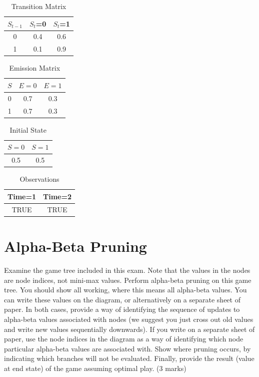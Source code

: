 \documentclass{article}
\begin{document}
\begin{table}[h!]
\caption{Transition Matrix}
\label{hmmvit1}
\begin{center}
\begin{tabular}{ |c||c|c| } 
\hline
 $S_{t-1}$ & $S_t$=0 & $S_t$=1\\
\hline
 0 & 0.4 & 0.6\\
 1 & 0.1 & 0.9\\
\hline
\end{tabular}
\end{center}
\end{table}
\begin{table}[h!]
\caption{Emission Matrix}
\label{hmmvit2}
\begin{center}
\begin{tabular}{ |c||c|c| } 
\hline
 $S$ & $E=0$ & $E=1$\\
\hline
 0 & 0.7 & 0.3\\
 1 & 0.7 & 0.3\\
\hline
\end{tabular}
\end{center}
\end{table}
\begin{table}[h!]
\caption{Initial State}
\label{hmmvit3}
\begin{center}
\begin{tabular}{ |c|c| } 
\hline
 $S=0$ & $S=1$\\
\hline
0.5 & 0.5\\
\hline
\end{tabular}
\end{center}
\end{table}
\begin{table}[h!]
\caption{Observations}
\label{hmmvit4}
\begin{center}
\begin{tabular}{ |c|c| } 
\hline
 Time=1 & Time=2\\
\hline
TRUE & TRUE\\
\hline
\end{tabular}
\end{center}
\end{table}
\clearpage
\section{Alpha-Beta Pruning}

Examine the game tree included in this exam. Note that the values in the nodes are node indices, not mini-max values. Perform alpha-beta pruning on this game tree.  You should show all working, where this means all alpha-beta values.  You can write these values on the diagram, or alternatively on a separate sheet of paper.  In both cases, provide a way of identifying the sequence of updates to alpha-beta values associated with nodes (we suggest you just cross out old values and write new values sequentially downwards).  If you write on a separate sheet of paper, use the node indices in the diagram as a way of identifying which node particular alpha-beta values are associated with.  Show where pruning occurs, by indicating which branches will not be evaluated.  Finally, provide the result (value at end state) of the game assuming optimal play. (3 marks)
\end{document}
